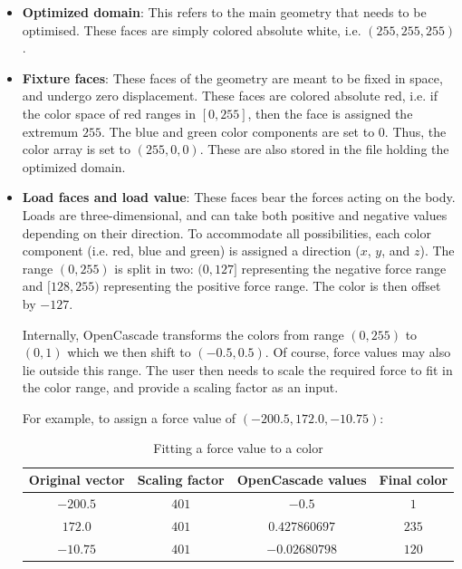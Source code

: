 \begin{itemize}
	\item \textbf{Optimized domain}: This refers to the main geometry that needs to be optimised. These faces are simply colored absolute white, i.e. $(255, 255, 255)$.
	\item \textbf{Fixture faces}: These faces of the geometry are meant to be fixed in space, and undergo zero displacement. These faces are colored absolute red, i.e. if the color space of red ranges in {$[0, 255]$}, then the face is assigned the extremum $255$. The blue and green color components are set to $0$. Thus, the color array is set to $(255, 0, 0)$. These are also stored in the file holding the optimized domain.
	\item \textbf{Load faces and load value}: These faces bear the forces acting on the body. Loads are three-dimensional, and can take both positive and negative values depending on their direction. To accommodate all possibilities, each color component (i.e. red, blue and green) is assigned a direction ($x$, $y$, and $z$). The range $(0, 255)$ is split in two: $(0, 127]$ representing the negative force range and $[128, 255)$ representing the positive force range. The color is then offset by $-127$. 

Internally, OpenCascade transforms the colors from range $(0, 255)$ to $(0,1)$ which we then shift to $(-0.5, 0.5)$. Of course, force values may also lie outside this range. The user then needs to scale the required force to fit in the color range, and provide a scaling factor as an input.

For example, to assign a force value of $(-200.5, 172.0, -10.75)$:

\begin{table}[h!]
	\begin{center}
		\caption{Fitting a force value to a color}
		\label{LoadFaceExample}
		\begin{tabular}{cccc}
			\toprule
			{\small Original vector} & {\small Scaling factor} & {\small OpenCascade values} & {\small Final color}\\
			\midrule
			$-200.5$ & $401$ & $-0.5$ & $1$\\
			$172.0$  & $401$ & $0.427860697$  & $235$\\
			$-10.75$ & $401$ & $-0.02680798$   & $120$\\
			\bottomrule
		\end{tabular}
	\end{center}
\end{table}


\end{itemize}
